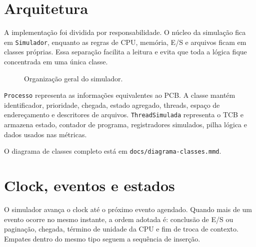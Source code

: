 \documentclass[11pt,a4paper]{article}
\begin{document}
\section{Arquitetura}

A implementação foi dividida por responsabilidade. O núcleo da simulação fica em \texttt{Simulador}, enquanto as regras de CPU, memória, E/S e arquivos ficam em classes próprias. Essa separação facilita a leitura e evita que toda a lógica fique concentrada em uma única classe.

\begin{figure}[H]
\centering
{}
\caption{Organização geral do simulador.}
\end{figure}

\texttt{Processo} representa as informações equivalentes ao PCB. A classe mantém identificador, prioridade, chegada, estado agregado, threads, espaço de endereçamento e descritores de arquivos. \texttt{ThreadSimulada} representa o TCB e armazena estado, contador de programa, registradores simulados, pilha lógica e dados usados nas métricas.

O diagrama de classes completo está em \texttt{docs/diagrama-classes.mmd}.

\section{Clock, eventos e estados}

O simulador avança o clock até o próximo evento agendado. Quando mais de um evento ocorre no mesmo instante, a ordem adotada é: conclusão de E/S ou paginação, chegada, término de unidade da CPU e fim de troca de contexto. Empates dentro do mesmo tipo seguem a sequência de inserção.
\end{document}
